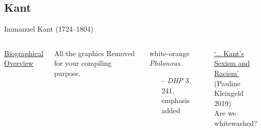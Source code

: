 \documentclass[10pt,letterpaper]{beamer}
\newcommand{\attrib}[1]{\begin{itemize}\setlength{\itemindent}{1cm}\item[\phantom{foobar}--]#1\end{itemize}}
\begin{document}
\subsection{Kant}
\begin{frame}{Immanuel Kant (1724–1804)}
\begin{columns}
    \centering
\underline{Biographical Overview}\\ 
\vspace{0.2em}
\begin{exampleblock}{All the graphics}
    Removed for your compiling purpose.
\end{exampleblock}
\vfill
\begin{beamercolorbox}[rounded=true,shadow=true]{white-orange}\justifying
\textit{Philonous}. 
\attrib{\textit{DHP} 3, 241, emphasis added}    
\end{beamercolorbox}

    \vfill
\href{https://research.rug.nl/en/publications/on-dealing-with-kants-sexism-and-racism}{\underline{`... Kant's Sexism and Racism'}}\\(Pauline Kleingeld 2019)\\{\small \textcolor{sustechorange}{Are we whitewashed?}}


\end{columns}
\end{frame}
\end{document}
